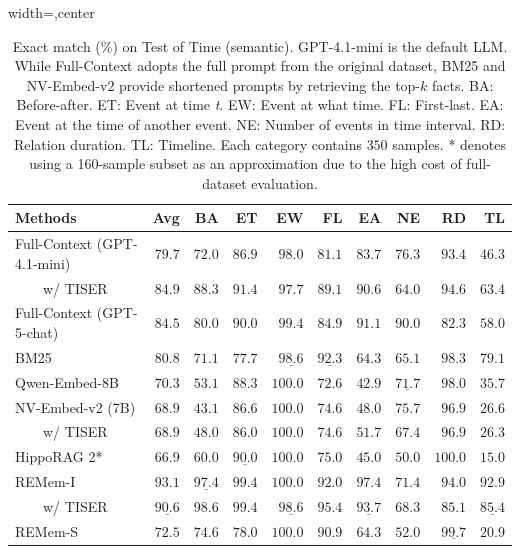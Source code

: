 \documentclass{article} %
\newcommand{\ours}{REMem\xspace}
\begin{document}
\begin{table}[tbh]
\centering
\caption{Exact match (\%) on Test of Time (semantic). GPT-4.1-mini is the default LLM. While Full-Context adopts the full prompt from the original dataset, BM25 and NV-Embed-v2 provide shortened prompts by retrieving the top-$k$ facts.
BA: Before-after. ET: Event at time \textit{t}. EW: Event at what time. FL: First-last. EA: Event at the time of another event. NE: Number of events in time interval. RD: Relation duration. TL: Timeline. Each category contains $350$ samples. * denotes using a 160-sample subset as an approximation due to the high cost of full-dataset evaluation.}
\vspace{0.2em}
\label{tab:test of time}
\begin{adjustbox}{width=\textwidth,center}
\begin{tabular}{l|r|rrrrrrrr}
\toprule
Methods & Avg & BA & ET & EW & FL & EA & NE & RD & TL \\
\midrule
Full-Context (GPT-4.1-mini) & $79.7$ & $72.0$ & $86.9$ & $98.0$ & $81.1$ & $83.7$ & $76.3$ & $93.4$ & $46.3$ \\
\ \ \ \ w/ TISER & $84.9$ & $88.3$ & $91.4$ & $97.7$ & $89.1$ & $90.6$ & $64.0$ & $94.6$ & $63.4$ \\
Full-Context (GPT-5-chat) & $84.5$ & $80.0$ & $90.0$ & $99.4$ & $84.9$ & $91.1$ & $90.0$ & $82.3$ & $58.0$ \\\midrule
BM25 & $80.8$ & $71.1$ & $77.7$ & $\underline{98.6}$ & $\underline{92.3}$ & $64.3$ & $65.1$ & $98.3$ & $79.1$ \\
Qwen-Embed-8B & $70.3$ & $53.1$ & $88.3$ & $\mathbf{100.0}$ & $72.6$ & $42.9$ & $\underline{71.7}$ & $98.0$ & $35.7$ \\
NV-Embed-v2 (7B) & $68.9$ & $43.1$ & $86.6$ & $\mathbf{100.0}$ & $74.6$ & $48.0$ & $\mathbf{75.7}$ & $96.9$ & $26.6$ \\
\ \ \ \ w/ TISER & $68.9$ & $48.0$ & $86.0$ & $\mathbf{100.0}$ & $74.6$ & $51.7$ & $67.4$ & $96.9$ & $26.3$ \\
HippoRAG 2* & $66.9$ & $60.0$ & $\underline{90.0}$ & $\mathbf{100.0}$ & $75.0$ & $45.0$ & $50.0$ & $\mathbf{100.0}$ & $15.0$ \\
 \midrule
\ours-I & $\mathbf{93.1}$ & $\underline{97.4}$ & $\mathbf{99.4}$ & $\mathbf{100.0}$ & $92.0$ & $\mathbf{97.4}$ & $71.4$ & $94.0$ & $\mathbf{92.9}$ \\
\ \ \ \ w/ TISER & $\underline{90.6}$ & $\mathbf{98.6}$ & $\mathbf{99.4}$ & $\underline{98.6}$ & $\mathbf{95.4}$ & $\underline{93.7}$ & $68.3$ & $85.1$ & $\underline{85.4}$ \\
\ours-S & $72.5$ & $74.6$ & $78.0$ & $\mathbf{100.0}$ & $90.9$ & $64.3$ & $52.0$ & $\underline{99.7}$ & $20.9$ \\ 
\bottomrule
\end{tabular}
\end{adjustbox}
\end{table}
\end{document}
